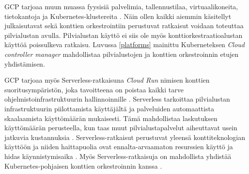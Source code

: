GCP tarjoaa muun muassa fyysisiä palvelimia, tallennustilaa, virtuaalikoneita, tietokantoja ja Kubernetes-klustereita \cite{Products23}.
Näin ollen kaikki aiemmin käsitellyt julkaisutavat sekä konttien orkestrointiin perustuvat ratkaisut voidaan toteuttaa pilvialustan avulla.
Pilvialustan käyttö ei siis ole myös konttiorkestraatioalustan käyttöä poissulkeva ratkaisu.
Luvussa \ref{platforms} mainittu Kuberneteksen \textit{Cloud controller manager} mahdollistaa pilvialustojen ja konttien orkestroinnin etujen yhdistämisen.

GCP tarjoaa myös Serverless-ratkaisuna \textit{Cloud Run} nimisen konttien suoritusympäristön, joka tavoitteena on poistaa kaikki tarve ohjelmistoinfrastruktuurin hallinnoinnille \cite{Products23}.
Serverless tarkoittaa pilvialustan infrastruktuurin piilottamista käyttäjältä ja palveluiden automaattista skaalaamista käyttömäärän mukaisesti.
Tämä mahdollistaa laskutuksen käyttömäärän perusteella, kun taas muut pilvialustapalvelut aiheuttavat usein jatkuvia kustannuksia \cite{shafiei22}.
Serverless-ratkaisut perustuvat yleensä konttiteknologian käyttöön ja niiden haittapuolia ovat ennalta-arvaamaton resurssien käyttö ja hidas käynnistymisaika \cite{shafiei22, mondal22}.
Myös Serverless-ratkaisuja on mahdollista yhdistää Kubernetes-pohjaisen konttien orkestroinnin kanssa \cite{mondal22}. 

